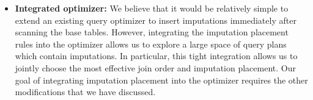 {\begin{itemize}

\item \textbf{Integrated optimizer:}
  We believe that it would be relatively simple to extend an existing query optimizer to insert imputations immediately after scanning the base tables.
  However, integrating the imputation placement rules into the optimizer allows us to explore a large space of query plans which contain imputations.
  In particular, this tight integration allows us to jointly choose the most effective join order and imputation placement.
  Our goal of integrating imputation placement into the optimizer requires the other modifications that we have discussed.
\end{itemize}
}


